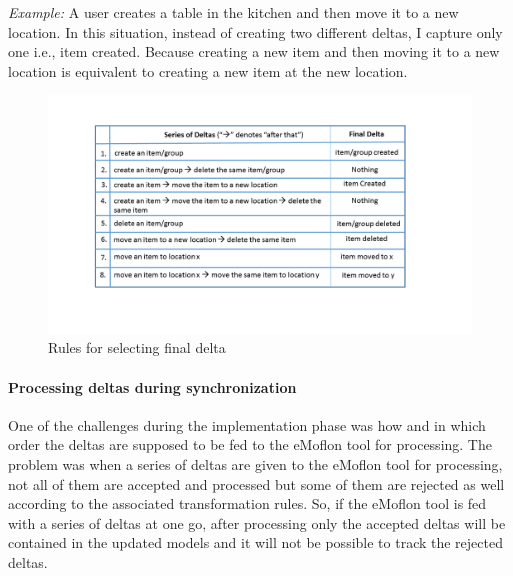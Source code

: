 \textit{Example:} A user creates a table in the kitchen and then move it to a new location. In this situation, instead of creating two different deltas, I capture only one i.e., item created. Because creating a new item and then moving it to a new location is equivalent to creating a new item at the new location.

\begin{figure}
	\includegraphics[width=1\textwidth]{figures/seriesofdeltas}
	\caption{Rules for selecting final delta}
	\label{fig:seriesofdeltas}
\end{figure}

\paragraph{Processing deltas during synchronization}
One of the challenges during the implementation phase was how and in which order the deltas are supposed to be fed to the eMoflon tool for processing. The problem was when a series of deltas are given to the eMoflon tool for processing, not all of them are accepted and processed but some of them are rejected as well according to the associated transformation rules. So, if the eMoflon tool is fed with a series of deltas at one go, after processing only the accepted deltas will be contained in the updated models and it will not be possible to track the rejected deltas. 

